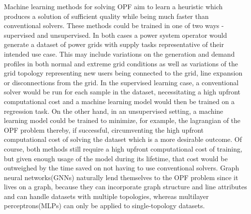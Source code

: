 Machine learning methods for solving OPF aim to learn a heuristic which produces
a solution of sufficient quality while being much faster than conventional solvers.
These methods could be trained in one of two ways - supervised and unsupervised.
In both cases a power system operator would generate a dataset of power grids with
supply tasks representative of their intended use case.
This may include variations on the generation and demand profiles in both normal
and extreme grid conditions as well as variations of the grid topology representing
new users being connected to the grid, line expansion or disconnections from the
grid.
In the supervised learning case, a conventional solver would be run for each sample
in the dataset, necessitating a high upfront computational cost and a machine
learning model would then be trained on a regression task.
On the other hand, in an unsupervised setting, a machine learning model could be
trained to minimize, for example, the lagrangian of the OPF problem thereby,
if successful, circumventing the high upfront computational cost of solving the
dataset which is a more desirable outcome.
Of course, both methods still require a high upfront computational cost of
training, but given enough usage of the model during its lifetime, that cost
would be outweighed by the time saved on not having to use conventional solvers.
Graph neural networks(GNNs) naturally lend themselves to the OPF problem since it
lives on a graph, because they can incorporate graph structure and line attributes and can
handle datasets with multiple topologies, whereas multilayer perceptrons(MLPs)
can only be applied to single-topology datasets.
